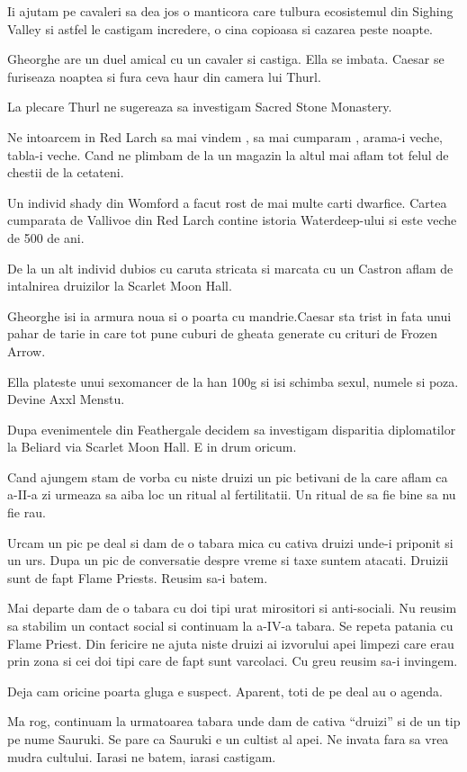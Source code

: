 \documentclass[12pt,oneside]{book}
\begin{document}
Ii ajutam pe cavaleri sa dea jos o manticora care tulbura ecosistemul din Sighing Valley si 
astfel le castigam incredere, o cina copioasa si cazarea peste noapte.

Gheorghe are un duel amical cu un cavaler si castiga. Ella se imbata. Caesar se furiseaza
noaptea si fura ceva haur din camera lui Thurl.

La plecare Thurl ne sugereaza sa investigam Sacred Stone Monastery.

Ne intoarcem in Red Larch sa mai vindem , sa mai cumparam , arama-i veche, tabla-i veche.
Cand ne plimbam de la un magazin la altul mai aflam tot felul de chestii de la cetateni.

Un individ shady din Womford a facut rost de mai multe carti dwarfice. Cartea
cumparata de Vallivoe din Red Larch contine istoria Waterdeep-ului si este veche 
de 500 de ani.

De la un alt individ dubios cu caruta stricata si marcata cu un Castron aflam de intalnirea 
druizilor la Scarlet Moon Hall.

Gheorghe isi ia armura noua si o poarta cu mandrie.Caesar sta trist in fata unui pahar de tarie in  care tot pune cuburi de gheata generate cu crituri de Frozen Arrow.

Ella plateste unui sexomancer de la han 100g si isi schimba sexul, numele si poza. Devine Axxl Menstu.


Dupa evenimentele din Feathergale decidem sa investigam disparitia diplomatilor la Beliard 
via Scarlet Moon Hall. E in drum oricum. 

Cand ajungem stam de vorba cu niste druizi un
pic betivani de la care aflam ca a-II-a zi urmeaza sa aiba loc un ritual al fertilitatii. Un ritual
de sa fie bine sa nu fie rau. 

Urcam un pic pe deal si dam de o tabara mica cu cativa druizi unde-i priponit si un urs. Dupa un 
pic de conversatie despre vreme si taxe suntem atacati. Druizii sunt de fapt Flame Priests. Reusim
sa-i batem.

Mai departe dam de o tabara cu doi tipi urat mirositori si anti-sociali. Nu reusim sa stabilim
un contact social si continuam la a-IV-a tabara. Se repeta patania cu Flame Priest. Din fericire
ne ajuta niste druizi ai izvorului apei limpezi care erau prin zona si cei doi tipi care de fapt
sunt varcolaci. Cu greu reusim sa-i invingem. 

Deja cam oricine poarta gluga e suspect. Aparent, toti de pe deal au o agenda.

Ma rog, continuam la urmatoarea tabara unde dam de cativa ``druizi'' si de un tip pe nume Sauruki. 
Se pare ca Sauruki e un cultist al apei. Ne invata fara sa vrea mudra cultului. Iarasi ne batem,
iarasi castigam.
\end{document}
